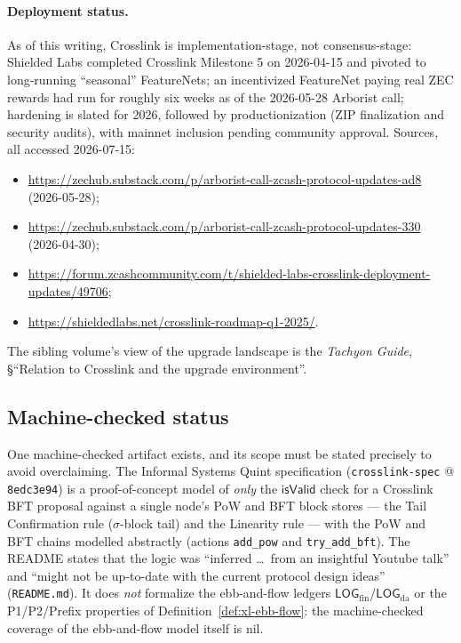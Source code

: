 \documentclass[11pt,a4paper]{article}
\theoremstyle{definition}
\begin{document}
\paragraph{Deployment status.} As of this writing, Crosslink is
implementation-stage, not consensus-stage: Shielded Labs completed
Crosslink Milestone 5 on 2026-04-15 and pivoted to long-running
``seasonal'' FeatureNets; an incentivized FeatureNet paying real ZEC
rewards had run for roughly six weeks as of the 2026-05-28 Arborist call;
hardening is slated for 2026, followed by productionization (ZIP
finalization and security audits), with mainnet inclusion pending
community approval. Sources, all accessed 2026-07-15:
\begin{itemize}[leftmargin=*]\small
\item \url{https://zechub.substack.com/p/arborist-call-zcash-protocol-updates-ad8}
  (2026-05-28);
\item \url{https://zechub.substack.com/p/arborist-call-zcash-protocol-updates-330}
  (2026-04-30);
\item
  \url{https://forum.zcashcommunity.com/t/shielded-labs-crosslink-deployment-updates/49706};
\item \url{https://shieldedlabs.net/crosslink-roadmap-q1-2025/}.
\end{itemize}
The sibling volume's view of the upgrade landscape is the
\emph{Tachyon Guide}, \S``Relation to Crosslink and the upgrade
environment''.

\subsection{Machine-checked status}\label{sec:xl-machine-checked}

One machine-checked artifact exists, and its scope must be stated
precisely to avoid overclaiming. The Informal Systems Quint specification
(\texttt{crosslink-spec} @ \texttt{8edc3e94}) is a proof-of-concept model
of \emph{only} the $\mathsf{isValid}$ check for a Crosslink BFT proposal
against a single node's PoW and BFT block stores --- the Tail Confirmation
rule ($\sigma$-block tail) and the Linearity rule --- with the PoW and BFT
chains modelled abstractly (actions \texttt{add\_pow} and
\texttt{try\_add\_bft}). The README states that the logic was ``inferred
\dots\ from an insightful Youtube talk'' and ``might not be up-to-date
with the current protocol design ideas'' (\texttt{README.md}). It does
\emph{not} formalize the ebb-and-flow ledgers
$\mathsf{LOG}_{\mathrm{fin}}$/$\mathsf{LOG}_{\mathrm{da}}$ or the
P1/P2/Prefix properties of Definition~\ref{def:xl-ebb-flow}: the
machine-checked coverage of the ebb-and-flow model itself is nil.
\end{document}

